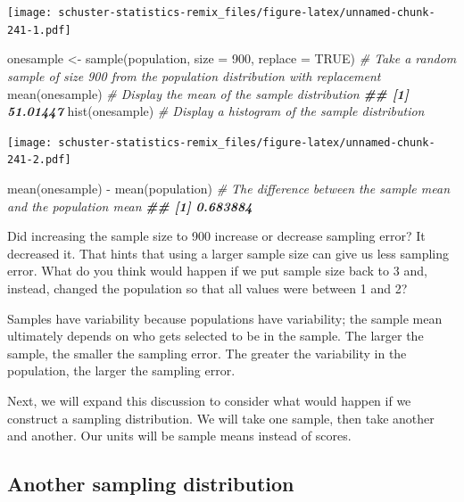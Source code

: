 \documentclass[
]{book}
\newenvironment{Shaded}{\begin{snugshade}}{\end{snugshade}}
\newcommand{\AttributeTok}[1]{\textcolor[rgb]{0.77,0.63,0.00}{#1}}
\newcommand{\CommentTok}[1]{\textcolor[rgb]{0.56,0.35,0.01}{\textit{#1}}}
\newcommand{\ConstantTok}[1]{\textcolor[rgb]{0.00,0.00,0.00}{#1}}
\newcommand{\DecValTok}[1]{\textcolor[rgb]{0.00,0.00,0.81}{#1}}
\newcommand{\DocumentationTok}[1]{\textcolor[rgb]{0.56,0.35,0.01}{\textbf{\textit{#1}}}}
\newcommand{\FunctionTok}[1]{\textcolor[rgb]{0.00,0.00,0.00}{#1}}
\newcommand{\NormalTok}[1]{#1}
\newcommand{\OtherTok}[1]{\textcolor[rgb]{0.56,0.35,0.01}{#1}}
\newcommand{\SpecialCharTok}[1]{\textcolor[rgb]{0.00,0.00,0.00}{#1}}
\begin{document}
\texttt{[image: schuster-statistics-remix\_files/figure-latex/unnamed-chunk-241-1.pdf]}

\begin{Shaded}
\begin{Highlighting}[]
\NormalTok{onesample }\OtherTok{\textless{}{-}} \FunctionTok{sample}\NormalTok{(population, }\AttributeTok{size =} \DecValTok{900}\NormalTok{, }\AttributeTok{replace =} \ConstantTok{TRUE}\NormalTok{) }\CommentTok{\# Take a random sample of size 900 from the population distribution with replacement}
\FunctionTok{mean}\NormalTok{(onesample) }\CommentTok{\# Display the mean of the sample distribution}
\DocumentationTok{\#\# [1] 51.01447}
\FunctionTok{hist}\NormalTok{(onesample) }\CommentTok{\# Display a histogram of the sample distribution}
\end{Highlighting}
\end{Shaded}

\texttt{[image: schuster-statistics-remix\_files/figure-latex/unnamed-chunk-241-2.pdf]}

\begin{Shaded}
\begin{Highlighting}[]
\FunctionTok{mean}\NormalTok{(onesample) }\SpecialCharTok{{-}} \FunctionTok{mean}\NormalTok{(population) }\CommentTok{\# The difference between the sample mean and the population mean}
\DocumentationTok{\#\# [1] 0.683884}
\end{Highlighting}
\end{Shaded}

Did increasing the sample size to 900 increase or decrease sampling error? It decreased it. That hints that using a larger sample size can give us less sampling error. What do you think would happen if we put sample size back to 3 and, instead, changed the population so that all values were between 1 and 2?

Samples have variability because populations have variability; the sample mean ultimately depends on who gets selected to be in the sample. The larger the sample, the smaller the sampling error. The greater the variability in the population, the larger the sampling error.

Next, we will expand this discussion to consider what would happen if we construct a sampling distribution. We will take one sample, then take another and another. Our units will be sample means instead of scores.

\hypertarget{another-sampling-distribution}{%
\subsection{Another sampling distribution}\label{another-sampling-distribution}}
\end{document}

